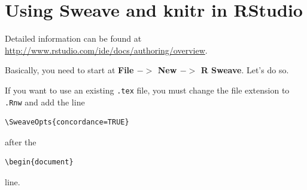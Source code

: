 \documentclass[12pt]{article}
\begin{document}
\newpage


\section{Using Sweave and knitr in RStudio}

Detailed information can be found at
\url{http://www.rstudio.com/ide/docs/authoring/overview}.

Basically, you need to start at \textbf{File $->$ New $->$ R Sweave}.
Let's do so.


If you want to use an existing \verb|.tex| file, you must change the file
extension to \verb|.Rnw| and add the line
\begin{verbatim}
\SweaveOpts{concordance=TRUE}
\end{verbatim}
after the 
\begin{verbatim}
\begin{document}
\end{verbatim}
line.
 
\end{document}
